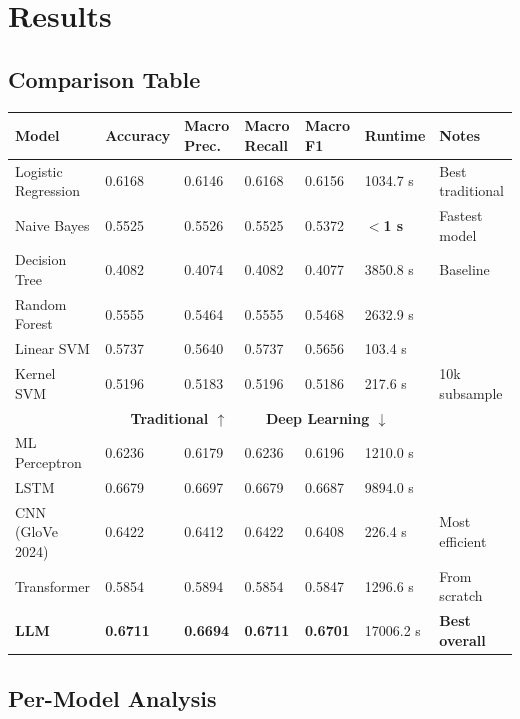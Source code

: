 \documentclass[12pt]{article}
\begin{document}
\section{Results}
\label{sec:results}

\subsection{Comparison Table}
\label{sec:comparison}
 
\begin{longtable}{p{} p{} p{} p{} p{} p{} p{}}
    \toprule
    Model & Accuracy & Macro Prec. & Macro Recall & Macro F1 & Runtime & Notes \\
    \midrule
    \endhead
    Logistic Regression    & 0.6168 & 0.6146 & 0.6168 & 0.6156 & 1034.7 s & Best traditional \\
    Naive Bayes            & 0.5525 & 0.5526 & 0.5525 & 0.5372 & \textbf{$<$1 s}   & Fastest model \\
    Decision Tree          & 0.4082 & 0.4074 & 0.4082 & 0.4077 & 3850.8 s & Baseline \\
    Random Forest          & 0.5555 & 0.5464 & 0.5555 & 0.5468 & 2632.9 s & \\
    Linear SVM             & 0.5737 & 0.5640 & 0.5737 & 0.5656 & 103.4 s  & \\
    Kernel SVM             & 0.5196 & 0.5183 & 0.5196 & 0.5186 & 217.6 s  & 10k subsample \\
    \midrule
        \multicolumn{7}{c}{\textbf{Traditional $\uparrow$ \ \ \ \ Deep Learning $\downarrow$}} \\
    \midrule
    ML Perceptron & 0.6236 & 0.6179 & 0.6236 & 0.6196 & 1210.0 s  & \\
    LSTM                   & 0.6679 & 0.6697 & 0.6679 & 0.6687 & 9894.0 s & \\
    CNN (GloVe 2024)       & 0.6422 & 0.6412 & 0.6422 & 0.6408 & 226.4 s  &  Most efficient \\
    Transformer            & 0.5854 & 0.5894 & 0.5854 & 0.5847 & 1296.6 s & From scratch \\
    \textbf{LLM}   & \textbf{0.6711} & \textbf{0.6694} & \textbf{0.6711} & \textbf{0.6701} & 17006.2 s & \textbf{Best overall}\\
    \bottomrule
\end{longtable}
 
\subsection{Per-Model Analysis}
\end{document}

